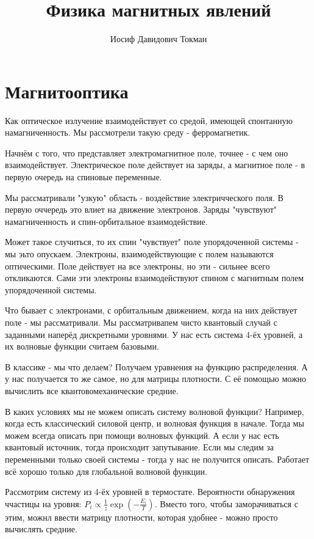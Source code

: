 \documentclass[a4paper, 14pt, russian]{article}
\title{Физика магнитных явлений}
\author{Иосиф Давидович Токман}
\date{}
\begin{document}
	\maketitle

	\section{Магнитооптика}

	Как оптическое излучение взаимодействует со средой, имеющей спонтанную
	намагниченность. Мы рассмотрели такую среду - ферромагнетик.

	Начнём с того, что представляет электромагнитное поле, точнее - 
	с чем оно взаимодействует. Электрическое поле действует на заряды, а магнитное
	поле - в первую очередь на спиновые переменные.

	Мы рассматривали "узкую" область - воздействие электричческого поля.
	В первую оччередь это влиет на движение электронов. Заряды "чувствуют"
	намагниченность и спин-орбитальное взаимодействие. 

	Может такое случиться, то их спин "чувствует" поле упорядоченной 
	системы - мы эьто опускаем. Электроны, взаимодействующие с полем 
	называются оптическими. Поле действует на все электроны, но эти - 
	сильнее всего откликаются. Сами эти электроны взаимодействуют спином 
	с магнитным полем упорядоченной системы.

	Что бывает с электронами, с орбитальным движением, когда на 
	них действует поле - мы рассматривали. Мы рассматривапем чисто 
	квантовый случай с заданными наперёд дискретными уровнями.
	У нас есть система 4-ёх уровней, а их волновые функции считаем базовыми.

	В классике - мы что делаем? Получаем уравнения на функцию распределения.
	А у нас получается то же самое, но для матрицы плотности. С её помощью
	можно вычислить все квантовомеханические средние.

	В каких условиях мы не можем описать систему волновой функции? Например,
	когда есть классический силовой центр, и волновая функция в начале. Тогда 
	мы можем всегда описать при помощи волновых функций. А если у нас есть 
	квантовый источник, тогда происходит запутывание. Если мы следим
	за переменными только своей системы - тогда у нас не получится описать. 
	Работает всё хорошо только для глобальной волновой функции.

	Рассмотрим систему из 4-ёх уровней в термостате. Вероятности обнаружения
	ччастицы на уровня: $P_i \propto \frac{1}{z} \exp(-\frac{E_i}{T})$.
	Вместо того, чтобы заморачиваться с этим, можнл ввести матрицу плотности,
	которая удобнее - можно просто вычислять средние.
\end{document}

